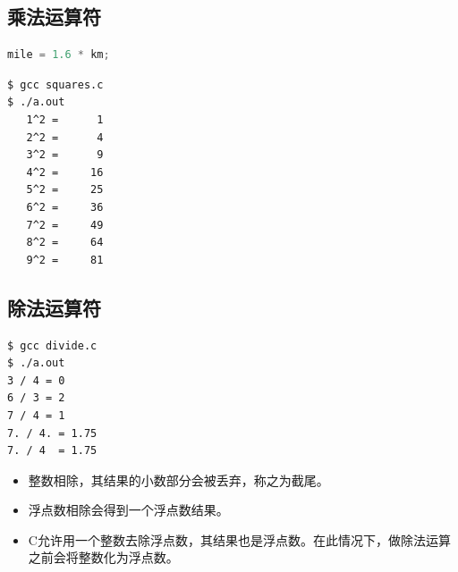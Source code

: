 \subsection{乘法运算符}
\begin{frame}[fragile]\ft{\subsecname}
\begin{lstlisting}[language=c,backgroundcolor=\color{red!10}]
  mile = 1.6 * km;
\end{lstlisting}
\vspace{1em}

\end{frame}


\begin{frame}[fragile]\ft{\subsecname}


\end{frame}


\begin{frame}[fragile]\ft{\subsecname}
\begin{lstlisting}[backgroundcolor=\color{red!10}]
$ gcc squares.c
$ ./a.out 
   1^2 =      1
   2^2 =      4
   3^2 =      9
   4^2 =     16
   5^2 =     25
   6^2 =     36
   7^2 =     49
   8^2 =     64
   9^2 =     81
\end{lstlisting}
\end{frame}



\subsection{除法运算符}
\begin{frame}[fragile]\ft{\subsecname}
      
\end{frame}
\begin{frame}[fragile]\ft{\subsecname}
\begin{lstlisting}[backgroundcolor=\color{red!10}]
$ gcc divide.c
$ ./a.out  
3 / 4 = 0
6 / 3 = 2
7 / 4 = 1
7. / 4. = 1.75
7. / 4  = 1.75
\end{lstlisting}    
\end{frame}




\begin{frame}[fragile]\ft{\subsecname}
\begin{itemize}
\item 整数相除，其结果的小数部分会被丢弃，称之为截尾。\\[0.1in]
\item 浮点数相除会得到一个浮点数结果。\\[0.1in]
\item C允许用一个整数去除浮点数，其结果也是浮点数。在此情况下，做除法运算之前会将整数化为浮点数。
\end{itemize}
\end{frame}

